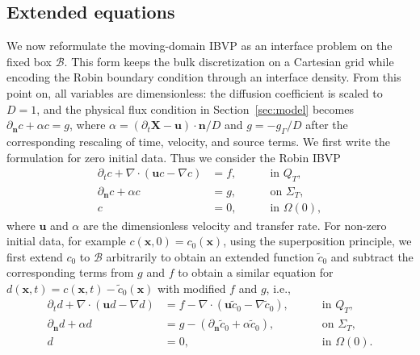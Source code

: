 \documentclass[11pt,reqno]{amsart}
\theoremstyle{plain}
\theoremstyle{definition}
\numberwithin{equation}{section}
\newcommand{\paren}[1]{\left(#1\right)}
\newcommand{\p}{\partial}
\newcommand{\grad}[1]{\nabla #1}
\newcommand{\mc}[1]{\mathcal{#1}}
\newcommand{\wt}[1]{\widetilde{#1}}
\newcommand{\bm}[1]{\boldsymbol{#1}}
\begin{document}
\subsection{Extended equations}
We now reformulate the moving-domain IBVP as an interface problem on the fixed
box $\mc B$. This form keeps the bulk discretization on a Cartesian grid while
encoding the Robin boundary condition through an interface density. From this
point on, all variables are dimensionless: the diffusion coefficient is scaled to $D=1$, and the
physical flux condition in Section~\ref{sec:model} becomes
$\partial_{\bm n}c+\alpha c=g$, where
$\alpha=(\partial_t\bm X-\bm u)\cdot\bm n/D$ and
$g=-g_\Gamma/D$ after the corresponding rescaling of time, velocity, and source
terms. We first write the formulation for zero initial data.
Thus we consider the Robin IBVP
\begin{equation}\label{eqn:adv-diff-2}
\begin{aligned}
    \partial_t c + \grad\cdot(\bm u c - \grad c) &= f , \quad&&\text{ in }Q_T, \\
    \p_{\bm n}c + \alpha c  &= g, \quad&&\text{ on }\Sigma_T,\\
    c &= 0, \quad&& \text{ in }\Omega(0),
\end{aligned}
\end{equation}
where $\bm u$ and $\alpha$ are the dimensionless velocity and transfer rate.
For non-zero initial data, for example $c(\bm x,0) = c_0(\bm x)$, using the superposition principle, we first extend $c_0$ to $\mc B$ arbitrarily to obtain an extended function $\wt c_0$ and subtract the corresponding terms from $g$ and $f$ to obtain a similar equation for $d(\bm x,t) = c(\bm x, t) - \wt c_0(\bm x)$ with modified $f$ and $g$, i.e.,
\begin{equation}
\begin{aligned}
    \partial_t d + \grad\cdot(\bm u d- \grad d) &= f - \grad\cdot(\bm u \wt c_0- \grad \wt c_0), \quad&&\text{ in }Q_T, \\
    \p_{\bm n}d + \alpha d &= g - \paren{\partial_{\bm n}\wt c_0 + \alpha \wt c_0}, \quad&&\text{ on }\Sigma_T,\\
    d &= 0, \quad&& \text{ in }\Omega(0).
\end{aligned}
\end{equation}
\end{document}
